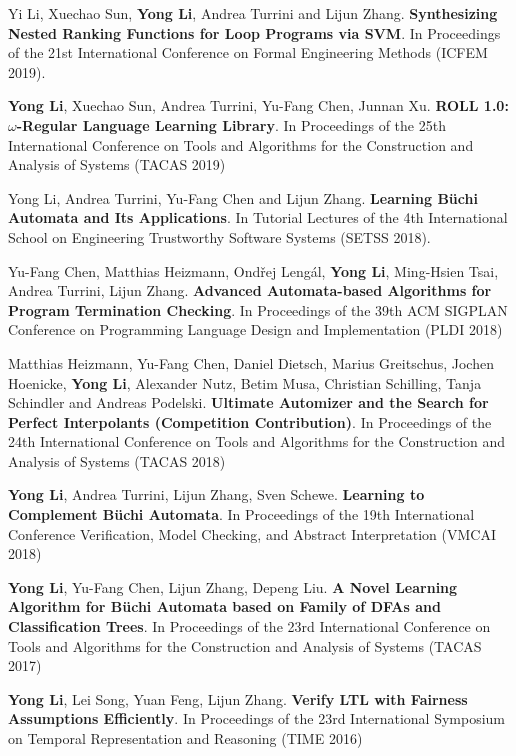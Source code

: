 \documentclass[a4paper]{article}
\begin{document}
\begin{CJK*}{UTF8}{gkai}
\begin{enumerate}[label={[\theenumi]},leftmargin=\parindent,align=left,labelwidth=\parindent,labelsep=4pt]
\item 
Yi Li, Xuechao Sun, \textbf{Yong Li}, Andrea Turrini and Lijun Zhang.
\textbf{Synthesizing Nested Ranking Functions for Loop Programs via SVM}.
In Proceedings of the  21st International Conference on Formal Engineering Methods (ICFEM 2019).

\item \textbf{Yong Li}, Xuechao Sun, Andrea Turrini, Yu-Fang Chen, Junnan Xu.
\textbf{ROLL 1.0: $\omega$-Regular Language Learning Library}.
In Proceedings of the 25th International Conference on Tools and Algorithms for the Construction and Analysis of Systems (TACAS 2019) 


\item 
Yong Li, Andrea Turrini, Yu{-}Fang Chen and Lijun Zhang.
\textbf{Learning B{\"{u}}chi Automata and Its Applications}.
In Tutorial Lectures of the 4th International School on Engineering Trustworthy Software Systems (SETSS 2018).
\item 
Yu-Fang Chen, Matthias Heizmann, Ond{\v{r}}ej  Leng\'{a}l, \textbf{Yong Li}, Ming-Hsien Tsai, Andrea Turrini, Lijun Zhang.
\textbf{Advanced Automata-based Algorithms for Program Termination Checking}.
In Proceedings of the 39th {ACM} {SIGPLAN} Conference on Programming Language Design and Implementation (PLDI 2018)

\item
	Matthias Heizmann, Yu-Fang Chen, Daniel Dietsch, Marius Greitschus, Jochen Hoenicke, \textbf{Yong Li}, Alexander Nutz, Betim Musa, Christian Schilling, Tanja Schindler and Andreas Podelski.
\textbf{Ultimate Automizer and the Search for Perfect Interpolants (Competition Contribution)}.
In Proceedings of the 24th International Conference on Tools and Algorithms for the Construction and Analysis of Systems (TACAS 2018) 

\item 
\textbf{Yong Li}, Andrea Turrini, Lijun Zhang, Sven Schewe.
\textbf{Learning to Complement B\"uchi Automata}.
In Proceedings of the 19th International Conference Verification, Model Checking, and Abstract Interpretation (VMCAI 2018)

\item
\textbf{Yong Li}, Yu-Fang Chen, Lijun Zhang, Depeng Liu.
\textbf{A Novel Learning Algorithm for {B\"uchi} Automata based on Family of {DFA}s and Classification Trees}.
In Proceedings of the 23rd International Conference on Tools and Algorithms for the Construction and Analysis of Systems (TACAS 2017)
 
\item  
\textbf{Yong Li}, Lei Song, Yuan Feng, Lijun Zhang.
\textbf{Verify LTL with Fairness Assumptions Efficiently}.
In Proceedings of the 23rd International Symposium on Temporal Representation and Reasoning (TIME 2016)


\end{enumerate}
\end{CJK*}
\end{document}
